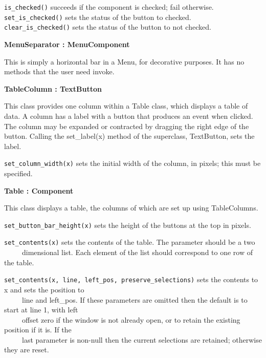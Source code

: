 \texttt{is\_checked()} succeeds if the component is checked; fail
otherwise.\\
\texttt{set\_is\_checked()} sets the status of the button to checked.\\
\texttt{clear\_is\_checked()} sets the status of the button to not checked.

{\ttfamily\bfseries
{}MenuSeparator : MenuComponent}

This is simply a horizontal bar in a Menu, for decorative purposes. It
has no methods that the user need invoke.

{\ttfamily\bfseries
{}TableColumn : TextButton}

This class provides one column within a Table class, which displays a
table of data. A column has a label with a button that produces an
event when clicked. The column may be expanded or contracted by
dragging the right edge of the button. Calling the set\_label(x) method
of the superclass, TextButton, sets the label.

\texttt{set\_column\_width(x)} sets the initial width of the column, in pixels;
this must be specified.


{\ttfamily\bfseries
{}Table : Component}

This class displays a table, the columns of which are set up using
TableColumns.

\texttt{set\_button\_bar\_height(x)} sets the height of the buttons at the top
in pixels.

\texttt{set\_contents(x)} sets the contents of the table. The parameter should be
a two\\
 \ \ \ \ \ dimensional list. Each element of the list should correspond
to one row of the table.

\texttt{set\_contents(x, line, left\_pos, preserve\_selections)} sets the
contents to x and sets the position to\\
 \ \ \ \ \ line and left\_pos. If these parameters are omitted then
the default is to start at line 1, with left\\
 \ \ \ \ \ offset zero if the window is not already open, or to retain
the existing position if it is. If the\\
 \ \ \ \ \ last parameter is non-null then the current selections are
retained; otherwise they are reset.

